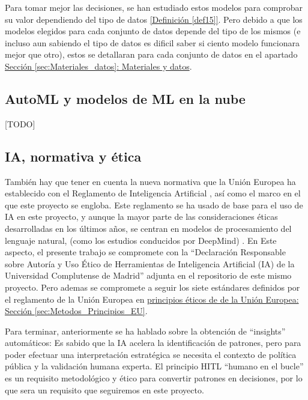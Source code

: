 Para tomar mejor las decisiones, se han estudiado estos modelos para comprobar su valor dependiendo del tipo de datos \hyperref[def15]{[Definición \ref*{def15}]}. Pero debido a que los modelos elegidos para cada conjunto de datos depende del tipo de los mismos (e incluso aun sabiendo el tipo de datos es dificil saber si ciento modelo funcionara mejor que otro), estos se detallaran para cada conjunto de datos en el apartado \hyperref[sec:Materiales_datos]{Sección \ref*{sec:Materiales_datos}: Materiales y datos}.

\subsection{AutoML y modelos de ML en la nube}

[TODO]

\subsection{IA, normativa y ética}

También hay que tener en cuenta la nueva normativa que la Unión Europea ha establecido con el Reglamento de Inteligencia Artificial \citep{webRIA2024Europa}, así como el marco en el que este proyecto se engloba. Este reglamento se ha usado de base para el uso de IA en este proyecto, y aunque la mayor parte de las consideraciones éticas desarrolladas en los últimos años, se centran en modelos de procesamiento del lenguaje natural, (como los estudios conducidos por DeepMind) \citep{gabriel2024ethicsadvancedaiassistants}. En Este aspecto, el presente trabajo se compromete con la ``Declaración Responsable sobre Autoría y Uso Ético de Herramientas de Inteligencia Artificial (IA) de la Universidad Complutense de Madrid'' adjunta en el repositorio de este mismo proyecto. Pero ademas se compromete a seguir los siete estándares definidos por el reglamento de la Unión Europea en \hyperref[sec:Metodos_Principios_EU]{principios éticos de de la Unión Europea: Sección \ref*{sec:Metodos_Principios_EU}}.

Para terminar, anteriormente se ha hablado sobre la obtención de ``insights'' automáticos: Es sabido que la IA acelera la identificación de patrones, pero para poder efectuar una interpretación estratégica se necesita el contexto de política pública y la validación humana experta. El principio HITL ``humano en el bucle'' \citep{MosqueiraRey2023} es un requisito metodológico y ético para convertir patrones en decisiones, por lo que sera un requisito que seguiremos en este proyecto.


